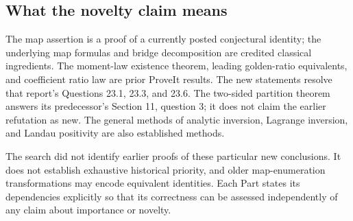 \documentclass[11pt,letterpaper]{article}
\numberwithin{equation}{section}
\theoremstyle{definition}
\theoremstyle{remark}
\begin{document}
\subsection{What the novelty claim means}

The map assertion is a proof of a currently posted conjectural identity;
the underlying map formulas and bridge decomposition are credited
classical ingredients. The moment-law existence theorem, leading
golden-ratio equivalents, and coefficient ratio law are prior ProveIt
results. The new statements resolve that report's Questions 23.1, 23.3,
and 23.6. The two-sided partition theorem answers its predecessor's
Section 11, question 3; it does not claim the earlier refutation as new.
The general methods of analytic inversion, Lagrange inversion, and
Landau positivity are also established methods.

The search did not identify earlier proofs of these particular new
conclusions. It does not establish exhaustive historical priority, and
older map-enumeration transformations may encode equivalent identities.
Each Part states its dependencies explicitly so that its correctness can
be assessed independently of any claim about importance or novelty.
\end{document}
